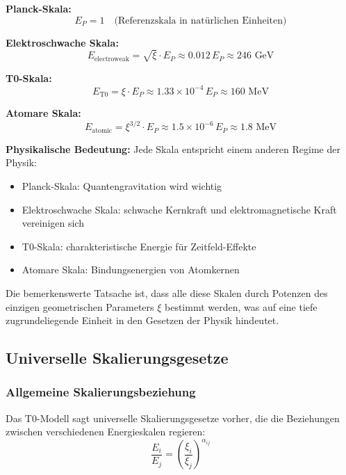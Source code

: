 \documentclass[12pt,a4paper]{article}
\newcommand{\xigeom}{\xi}
\begin{document}
	\textbf{Planck-Skala:}
	\begin{equation}
		E_P = 1 \quad \text{(Referenzskala in natürlichen Einheiten)}
	\end{equation}
	
	\textbf{Elektroschwache Skala:}
	\begin{equation}
		E_{\text{electroweak}} = \sqrt{\xigeom} \cdot E_P \approx 0.012 \, E_P \approx 246 \text{ GeV}
	\end{equation}
	
	\textbf{T0-Skala:}
	\begin{equation}
		E_{\text{T0}} = \xigeom \cdot E_P \approx 1.33 \times 10^{-4} \, E_P \approx 160 \text{ MeV}
	\end{equation}
	
	\textbf{Atomare Skala:}
	\begin{equation}
		E_{\text{atomic}} = \xigeom^{3/2} \cdot E_P \approx 1.5 \times 10^{-6} \, E_P \approx 1.8 \text{ MeV}
	\end{equation}
	
	\textbf{Physikalische Bedeutung:} Jede Skala entspricht einem anderen Regime der Physik:
	\begin{itemize}
		\item Planck-Skala: Quantengravitation wird wichtig
		\item Elektroschwache Skala: schwache Kernkraft und elektromagnetische Kraft vereinigen sich
		\item T0-Skala: charakteristische Energie für Zeitfeld-Effekte
		\item Atomare Skala: Bindungsenergien von Atomkernen
	\end{itemize}
	
	Die bemerkenswerte Tatsache ist, dass alle diese Skalen durch Potenzen des einzigen geometrischen Parameters $\xigeom$ bestimmt werden, was auf eine tiefe zugrundeliegende Einheit in den Gesetzen der Physik hindeutet.
	
	\subsection{Universelle Skalierungsgesetze}
	
	\subsubsection{Allgemeine Skalierungsbeziehung}
	
	Das T0-Modell sagt universelle Skalierungsgesetze vorher, die die Beziehungen zwischen verschiedenen Energieskalen regieren:
	\begin{equation}
		\frac{E_i}{E_j} = \left(\frac{\xigeom_i}{\xigeom_j}\right)^{\alpha_{ij}}
	\end{equation}
	
\end{document}
